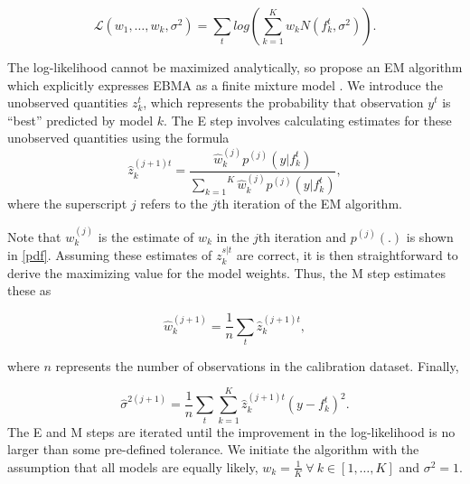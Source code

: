 \documentclass[12pt,fullpage,endnotes]{article}
\begin{document}
\begin{equation}
\mathcal{L}(w_1, \ldots, w_k, \sigma^2)=\sum_tlog\left(\sum_{k=1}^Kw_kN(f^t_k, \sigma^2) \right).
\end{equation}


\noindent The log-likelihood cannot be maximized analytically, so
\citet{Raftery:2005} propose an EM algorithm which explicitly
expresses EBMA as a finite mixture model
\cite{mclachlan:peel:2000,imai:tingley:2012}.  We introduce the
unobserved quantities $z_k^t$, which represents the probability that
observation $y^t$ is ``best'' predicted by model $k$.  The E step
involves calculating estimates for these unobserved quantities using
the formula
\begin{equation}
\label{E-step}
\hat{z}^{(j+1)t}_{k} = \frac{\hat{w}^{(j)}_k
p^{(j)}(y|f_{k}^{t})}{\overset{K}{\underset{k=1}{\sum}}\hat{w}^{(j)}_kp^{(j)}(y|f_{k}^{t})},
\end{equation}
\noindent where the superscript $j$ refers to the $j$th iteration of
the EM algorithm.

Note that $w_k^{(j)}$ is the estimate of $w_k$ in the $j$th iteration and
$p^{(j)}(.)$ is shown in \eqref{pdf}.  Assuming these estimates of
$z_{k}^{s|t}$ are correct, it is then straightforward to derive the
maximizing value for the model weights. Thus, the M step estimates
these as 

\begin{equation}
\label{M-step}
\hat{w}^{(j+1)}_k=\frac{1}{n}\underset{t}{\sum}\hat{z}^{(j+1)t}_{k},
\end{equation}

\noindent where $n$ represents the number of observations in the
calibration dataset.  Finally,

\begin{equation}
\label{sigma}
\hat{\sigma}^{2(j+1)}=\frac{1}{n}\underset{t}{\sum}\overset{K}{\underset{k=1}{\sum}}\hat{z}^{(j+1)t}_{k}(y-f_{k}^{t})^2.
\end{equation}
\noindent The E and M steps are iterated until the improvement in the
log-likelihood is no larger than some pre-defined tolerance.  We
initiate the algorithm with the assumption that all models are equally
likely, $w_k = \frac{1}{K} ~ \forall ~ k \in [1, \ldots, K]$ and
$\sigma^2=1$.
\end{document}
